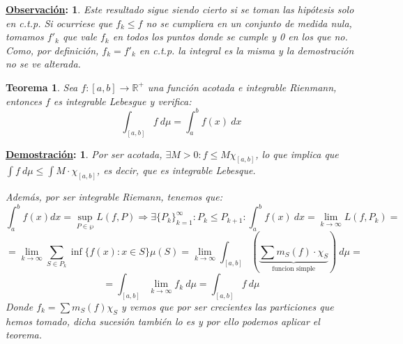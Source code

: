 \documentclass[10pt,a4paper,openright]{book}
\theoremstyle{break}
\newtheorem*{theo}{Teorema}
\newtheorem*{demo}{\underline{Demostración}:}
\newtheorem*{obs}{\underline{Observación}:}
\begin{document}
\begin{obs}
Este resultado sigue siendo cierto si se toman las hipótesis solo en c.t.p. Si ocurriese que $f_k \leq f$ no se cumpliera en un conjunto de medida nula, tomamos $f'_k$ que vale $f_k$ en todos los puntos donde se cumple y 0 en los que no. Como, por definición, $f_k = f'_k$ en c.t.p. la integral es la misma y la demostración no se ve alterada.
\end{obs}

\begin{theo}
Sea $f: \left[a, b\right] \rightarrow \mathbb{R}^+$ una función acotada e integrable Rienmann, entonces $f$ es integrable Lebesgue y verifica:
$$\int_{\left[a, b\right]}f \ d \mu = \int_a^b f\left(x\right)\ dx$$
\end{theo}
\begin{demo}
Por ser acotada, $\exists M > 0: f \le M\chi_{\left[a, b\right]}$, lo que implica que $\int f \ d \mu \leq \int M \cdot \chi_{[a,b]}$, es decir, que es integrable Lebesque.

Además, por ser integrable Riemann, tenemos que:
$$\int_a^b f\left(x\right)dx = \sup_{P \in \wp} L\left(f, P\right) \Rightarrow \exists \{P_k\}_{k=1}^{\infty} : P_k \leq P_{k+1} : \int_a^b f\left(x\right) \ dx = \lim_{k\rightarrow \infty} L\left(f, P_k\right) = $$
$$= \lim_{k\rightarrow\infty} \sum_{S \in P_k} \inf \{f\left(x\right) : x \in S\}\mu\left(S\right) = \lim_{k\rightarrow\infty} \int_{\left[a, b\right]}\left(\underbrace{\sum m_S \left(f\right) \cdot \chi_S}_{\text{funcion simple}}\right) \ d \mu = $$
$$= \int_{\left[a, b\right]}\lim_{k\rightarrow\infty} f_k \ d \mu = \int_{\left[a, b\right]}f \ d \mu$$
Donde $f_k = \sum m_S\left(f\right) \chi_S$ y vemos que por ser crecientes las particiones que hemos tomado, dicha sucesión también lo es y por ello podemos aplicar el teorema.
\end{demo}
\end{document}
